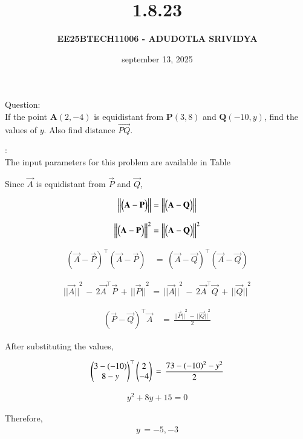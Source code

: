 \documentclass[journal]{IEEEtran}
\title{\textbf{1.8.23}}
\author{\textbf{EE25BTECH11006 - ADUDOTLA SRIVIDYA}}
\date{september 13, 2025}
\begin{document}
\maketitle

Question:\\
 If the point $\textbf{A}(2,-4)$ is equidistant from $\textbf{P}(3,8)$ and $\textbf{Q}(-10,y)$, find the values of $y$.
 Also find distance $\vec{PQ}$.

\solution:\\
The input parameters for this problem are available in Table 


Since $\vec{A}$ is equidistant from $\vec{P}$ and $\vec{Q}$,

\begin{align}
    \left\lVert\begin{pmatrix}\mathbf{A} - \mathbf{P}\end{pmatrix}\right\rVert = \left\lVert\begin{pmatrix}\mathbf{A} - \mathbf{Q}\end{pmatrix}\right\rVert
\end{align}

\begin{align}
     \left\lVert\begin{pmatrix}\mathbf{A} - \mathbf{P}\end{pmatrix}\right\rVert^2 = \left\lVert\begin{pmatrix}\mathbf{A} - \mathbf{Q}\end{pmatrix}\right\rVert^2
\end{align}

\begin{align}
    {(\vec{A} - \vec{P})}^\top (\vec{A} - \vec{P}) \, &= \, {(\vec{A} - \vec{Q})}^\top (\vec{A} - \vec{Q})
\end{align}

\begin{align}
 {||\vec{A}||}^2 \, - \, 2\vec{A}^\top\vec{P} \, + \, {||\vec{P}||}^2 \, = \, {||\vec{A}||}^2 \, - \, 2\vec{A}^\top\vec{Q} \, + \, {||\vec{Q}||}^2
\end{align}

\begin{align}
    {(\vec{P} - \vec{Q})}^\top \vec{A} \, &= \, \frac{{||\vec{P}||}^2\, - \, {||\vec{Q}||}^2}{2}
\end{align}


After substituting the values,

\begin{align}
    \begin{pmatrix}3-(-10)\\8-y\end{pmatrix}^\top\begin{pmatrix}2\\-4\end{pmatrix}\, = \, \frac{73-(-10)^2 -y^2}{2}
\end{align}

\begin{align}
    y^2 +8y + 15 = 0
\end{align}

Therefore,
\begin{align}
    y \, = -5 , -3
\end{align}
\end{document}
